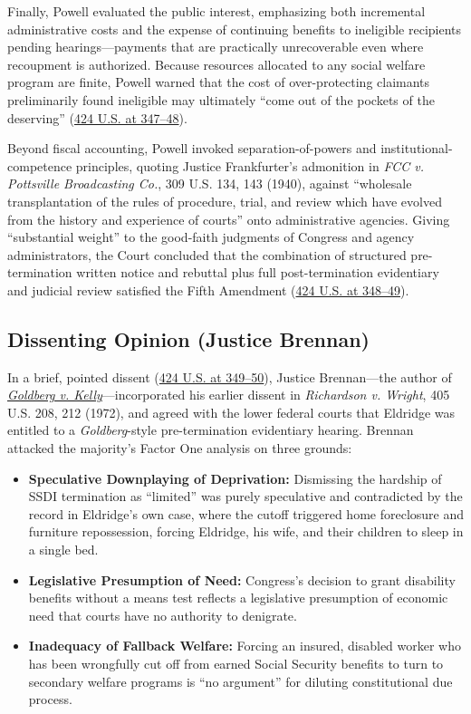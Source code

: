 \documentclass[12pt]{article}
\begin{document}
Finally, Powell evaluated the public interest, emphasizing both incremental administrative costs and the expense of continuing benefits to ineligible recipients pending hearings---payments that are practically unrecoverable even where recoupment is authorized. Because resources allocated to any social welfare program are finite, Powell warned that the cost of over-protecting claimants preliminarily found ineligible may ultimately ``come out of the pockets of the deserving'' (\href{https://supreme.justia.com/cases/federal/us/424/319/}{424 U.S. at 347--48}).

Beyond fiscal accounting, Powell invoked separation-of-powers and institutional-competence principles, quoting Justice Frankfurter's admonition in \emph{FCC v. Pottsville Broadcasting Co.}, 309 U.S. 134, 143 (1940), against ``wholesale transplantation of the rules of procedure, trial, and review which have evolved from the history and experience of courts'' onto administrative agencies. Giving ``substantial weight'' to the good-faith judgments of Congress and agency administrators, the Court concluded that the combination of structured pre-termination written notice and rebuttal plus full post-termination evidentiary and judicial review satisfied the Fifth Amendment (\href{https://supreme.justia.com/cases/federal/us/424/319/}{424 U.S. at 348--49}).

\subsection{Dissenting Opinion (Justice Brennan)}

In a brief, pointed dissent (\href{https://supreme.justia.com/cases/federal/us/424/319/}{424 U.S. at 349--50}), Justice Brennan---the author of \href{https://supreme.justia.com/cases/federal/us/397/254/}{\emph{Goldberg v. Kelly}}---incorporated his earlier dissent in \emph{Richardson v. Wright}, 405 U.S. 208, 212 (1972), and agreed with the lower federal courts that Eldridge was entitled to a \emph{Goldberg}-style pre-termination evidentiary hearing. Brennan attacked the majority's Factor One analysis on three grounds:
\begin{itemize}
    \item \textbf{Speculative Downplaying of Deprivation:} Dismissing the hardship of SSDI termination as ``limited'' was purely speculative and contradicted by the record in Eldridge's own case, where the cutoff triggered home foreclosure and furniture repossession, forcing Eldridge, his wife, and their children to sleep in a single bed.
    \item \textbf{Legislative Presumption of Need:} Congress's decision to grant disability benefits without a means test reflects a legislative presumption of economic need that courts have no authority to denigrate.
    \item \textbf{Inadequacy of Fallback Welfare:} Forcing an insured, disabled worker who has been wrongfully cut off from earned Social Security benefits to turn to secondary welfare programs is ``no argument'' for diluting constitutional due process.
\end{itemize}
\end{document}
